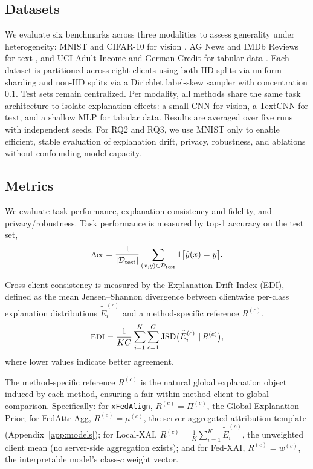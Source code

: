 \documentclass{article}
\theoremstyle{plain}
\theoremstyle{definition}
\theoremstyle{remark}
\begin{document}
\subsection{Datasets}
We evaluate six benchmarks across three modalities to assess generality under heterogeneity: MNIST and CIFAR-10 for vision \citep{lecun1998mnist,krizhevsky2009learning}, AG News and IMDb Reviews for text \citep{zhang2015character,maas2011learning}, and UCI Adult Income and German Credit for tabular data \citep{asuncion2007uci}. Each dataset is partitioned across eight clients using both IID splits via uniform sharding and non-IID splits via a Dirichlet label-skew sampler with concentration $0.1$. Test sets remain centralized. Per modality, all methods share the same task architecture to isolate explanation effects: a small CNN for vision, a TextCNN for text, and a shallow MLP for tabular data. Results are averaged over five runs with independent seeds.  For RQ2 and RQ3, we use MNIST only to enable efficient, stable evaluation of explanation drift, privacy, robustness, and ablations without confounding model capacity.

\subsection{Metrics}
We evaluate task performance, explanation consistency and fidelity, and privacy/robustness. Task performance is measured by top-1 accuracy on the test set,
\begin{equation}
\label{eq:acc}
{\small
\text{Acc}
=\frac{1}{|\mathcal{D}_{\text{test}}|}
\sum_{(x,y)\in\mathcal{D}_{\text{test}}}
\mathbf{1}\big[\hat{y}(x)=y\big].
}
\end{equation}

Cross-client consistency is measured by the Explanation Drift Index (EDI), defined as the mean Jensen--Shannon divergence between clientwise per-class explanation distributions $\tilde{\bar{E}}_i^{(c)}$ and a method-specific reference $R^{(c)}$,
\begin{equation}
\label{eq:edi}
{\small
\text{EDI}
=\frac{1}{KC}
\sum_{i=1}^{K}\sum_{c=1}^{C}
\mathrm{JSD}\big(\tilde{\bar{E}}_i^{(c)}\,\|\,R^{(c)}\big),
}
\end{equation}
where lower values indicate better agreement.

The method-specific reference $R^{(c)}$ is the natural global explanation object induced by each method, ensuring a fair within-method client-to-global comparison. Specifically: for \texttt{xFedAlign}, $R^{(c)} = \Pi^{(c)}$, the Global Explanation Prior; for FedAttr-Agg, $R^{(c)} = \mu^{(c)}$, the server-aggregated attribution template (Appendix~\ref{app:models}); for Local-XAI, $R^{(c)} = \tfrac{1}{K}\sum_{i=1}^{K} \tilde{\bar{E}}_i^{(c)}$, the unweighted client mean (no server-side aggregation exists); and for Fed-XAI, $R^{(c)} = w^{(c)}$, the interpretable model's class-$c$ weight vector.
\end{document}
